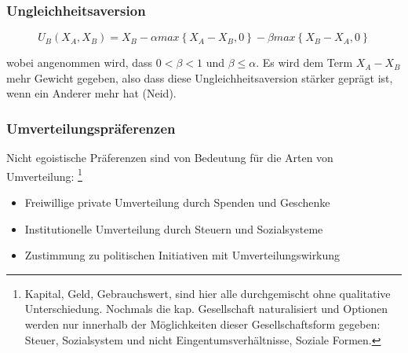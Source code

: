 \subsubsection{Ungleichheitsaversion}


\begin{equation}
    U_B(X_A,X_B) = X_B - \alpha max\left\{X_A-X_B,0\right\} - \beta max \left\{ X_B - X_A, 0\right\}
\end{equation}

wobei angenommen wird, dass $0 < \beta < 1$ und $\beta \le \alpha$. Es wird dem Term $X_A - X_B$ mehr Gewicht gegeben, also dass diese Ungleichheitsaversion 
stärker geprägt ist, wenn ein Anderer mehr hat (Neid). 

\subsubsection{Umverteilungspräferenzen}

Nicht egoistische Präferenzen sind von Bedeutung für die Arten von Umverteilung:  \footnote{Kapital, Geld, Gebrauchswert, sind hier alle durchgemischt ohne qualitative Unterschiedung. Nochmals die kap. Gesellschaft naturalisiert und Optionen werden nur innerhalb der Möglichkeiten dieser Gesellschaftsform gegeben: Steuer, Sozialsystem und nicht Eingentumsverhältnisse, Soziale Formen.}

\begin{itemize}
    \item Freiwillige private Umverteilung durch Spenden und Geschenke
    \item Institutionelle Umverteilung durch Steuern und Sozialsysteme
    \item Zustimmung zu politischen Initiativen mit Umverteilungswirkung
\end{itemize}
